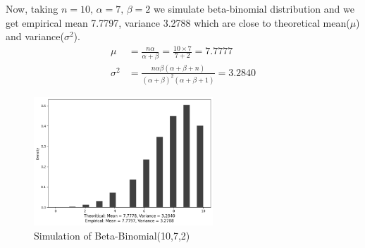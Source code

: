 \begin{example}
    Now, taking $ n=10,\,\alpha=7,\,\beta=2 $ we simulate beta-binomial distribution and we get empirical mean 7.7797, variance 3.2788 which are close to theoretical mean($ \mu $) and variance($ \sigma^2 $).
    \begin{align*}
        \mu &= \frac{n \alpha}{\alpha+\beta} = \frac{10 \times 7 }{ 7 + 2} = 7.7777 \\
        \sigma^2 &= \frac{n \alpha \beta(\alpha+\beta+n)}{(\alpha+\beta)^2(\alpha+\beta+1)} = 3.2840
    \end{align*}
    
    \begin{figure}[H]
        \centering
        \includegraphics[width=0.6\textwidth]{images/gibbs/ex2-beta-binomial.png}
        \caption{Simulation of Beta-Binomial(10,7,2)}
        \label{fig:beta-binomial simulation}
    \end{figure}

\end{example}



